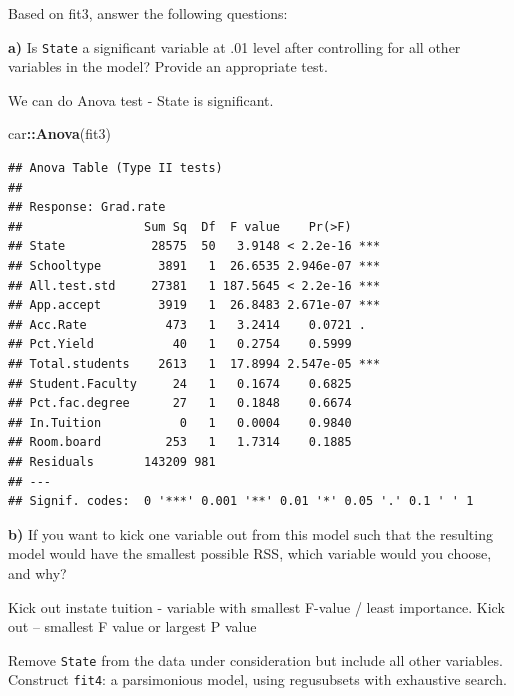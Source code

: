 \documentclass[]{article}
\newenvironment{Shaded}{\begin{snugshade}}{\end{snugshade}}
\newcommand{\KeywordTok}[1]{\textcolor[rgb]{0.13,0.29,0.53}{\textbf{#1}}}
\newcommand{\OperatorTok}[1]{\textcolor[rgb]{0.81,0.36,0.00}{\textbf{#1}}}
\newcommand{\NormalTok}[1]{#1}
\begin{document}
Based on fit3, answer the following questions:

\textbf{a)} Is \texttt{State} a significant variable at .01 level after
controlling for all other variables in the model? Provide an appropriate
test.

We can do Anova test - State is significant.

\begin{Shaded}
\begin{Highlighting}[]
\NormalTok{car}\OperatorTok{::}\KeywordTok{Anova}\NormalTok{(fit3)}
\end{Highlighting}
\end{Shaded}

\begin{verbatim}
## Anova Table (Type II tests)
## 
## Response: Grad.rate
##                 Sum Sq  Df  F value    Pr(>F)    
## State            28575  50   3.9148 < 2.2e-16 ***
## Schooltype        3891   1  26.6535 2.946e-07 ***
## All.test.std     27381   1 187.5645 < 2.2e-16 ***
## App.accept        3919   1  26.8483 2.671e-07 ***
## Acc.Rate           473   1   3.2414    0.0721 .  
## Pct.Yield           40   1   0.2754    0.5999    
## Total.students    2613   1  17.8994 2.547e-05 ***
## Student.Faculty     24   1   0.1674    0.6825    
## Pct.fac.degree      27   1   0.1848    0.6674    
## In.Tuition           0   1   0.0004    0.9840    
## Room.board         253   1   1.7314    0.1885    
## Residuals       143209 981                       
## ---
## Signif. codes:  0 '***' 0.001 '**' 0.01 '*' 0.05 '.' 0.1 ' ' 1
\end{verbatim}

\textbf{b)} If you want to kick one variable out from this model such
that the resulting model would have the smallest possible RSS, which
variable would you choose, and why?

Kick out instate tuition - variable with smallest F-value / least
importance. Kick out -- smallest F value or largest P value

\vspace{.1in}

Remove \texttt{State} from the data under consideration but include all
other variables. Construct \texttt{fit4}: a parsimonious model, using
regusubsets with exhaustive search.
\end{document}

